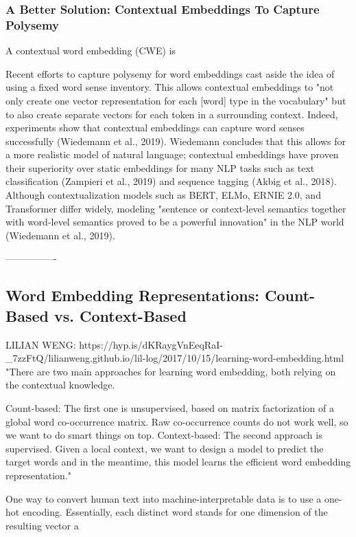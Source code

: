 \subsubsection{A Better Solution: Contextual Embeddings To Capture Polysemy}

A contextual word embedding (CWE) is

Recent efforts to capture polysemy for word embeddings cast aside the idea of using a fixed word sense inventory. This allows contextual embeddings to "not only create one vector representation for each [word] type in the vocabulary" but to also create separate vectors for each token in a surrounding context. Indeed, experiments show that contextual embeddings can capture word senses successfully (Wiedemann et al., 2019). Wiedemann concludes that this allows for a more realistic model of natural language; contextual embeddings have proven their superiority over static embeddings for many NLP tasks such as text classification (Zampieri et al., 2019) and sequence tagging (Akbig et al., 2018). Although contextualization models such as BERT, ELMo, ERNIE 2.0, and Transformer differ widely, modeling "sentence or context-level semantics together with word-level semantics proved to be a powerful innovation" in the NLP world (Wiedemann et al., 2019). 



----------------


\subsection{Word Embedding Representations: Count-Based vs. Context-Based}

LILIAN WENG: https://hyp.is/dKRaygVnEeqRaI-_7zzFtQ/lilianweng.github.io/lil-log/2017/10/15/learning-word-embedding.html
"There are two main approaches for learning word embedding, both relying on the contextual knowledge.

Count-based: The first one is unsupervised, based on matrix factorization of a global word co-occurrence matrix. Raw co-occurrence counts do not work well, so we want to do smart things on top.
Context-based: The second approach is supervised. Given a local context, we want to design a model to predict the target words and in the meantime, this model learns the efficient word embedding representation."


One way to convert human text into machine-interpretable data is to use a one-hot encoding. Essentially, each distinct word stands for one dimension of the resulting vector a




